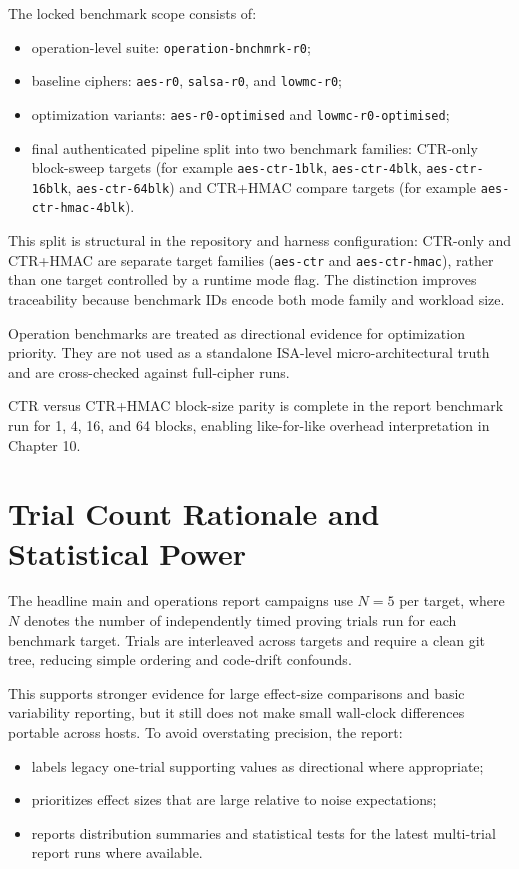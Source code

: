 The locked benchmark scope consists of:

\begin{itemize}
\item operation-level suite: \texttt{operation-bnchmrk-r0};
\item baseline ciphers: \texttt{aes-r0}, \texttt{salsa-r0}, and
\texttt{lowmc-r0};
\item optimization variants: \texttt{aes-r0-optimised} and
\texttt{lowmc-r0-optimised};
\item final authenticated pipeline split into two benchmark families:
CTR-only block-sweep targets (for example \texttt{aes-ctr-1blk},
\texttt{aes-ctr-4blk}, \texttt{aes-ctr-16blk}, \texttt{aes-ctr-64blk}) and
CTR+HMAC compare targets (for example \texttt{aes-ctr-hmac-4blk}).
\end{itemize}

This split is structural in the repository and harness configuration: CTR-only
and CTR+HMAC are separate target families (\texttt{aes-ctr} and
\texttt{aes-ctr-hmac}), rather than one target controlled by a runtime mode
flag. The distinction improves traceability because benchmark IDs encode both
mode family and workload size.

Operation benchmarks are treated as directional evidence for optimization
priority. They are not used as a standalone ISA-level micro-architectural truth
and are cross-checked against full-cipher runs.

CTR versus CTR+HMAC block-size parity is complete in the report benchmark run
for 1, 4, 16, and 64 blocks, enabling like-for-like overhead interpretation in
Chapter 10.

\section{Trial Count Rationale and Statistical Power}

The headline main and operations report campaigns use \(N=5\) per target, where
\(N\) denotes the number of independently timed proving trials run for each
benchmark target. Trials are interleaved across targets and require a clean git
tree, reducing simple ordering and code-drift confounds.

This supports stronger evidence for large effect-size comparisons and basic
variability reporting, but it still does not make small wall-clock differences
portable across hosts. To avoid overstating precision, the report:

\begin{itemize}
\item labels legacy one-trial supporting values as directional where appropriate;
\item prioritizes effect sizes that are large relative to noise expectations;
\item reports distribution summaries and statistical tests for the latest
multi-trial report runs where available.
\end{itemize}

